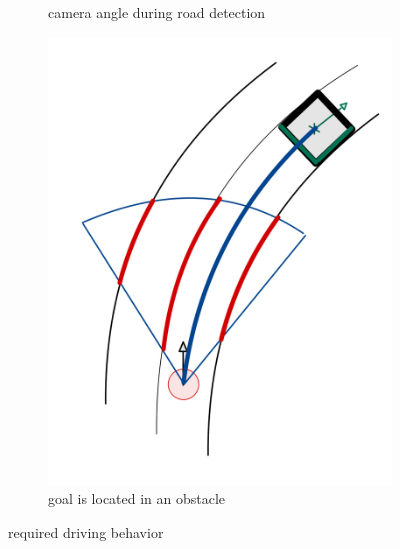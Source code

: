 \begin{figure}
\begin{subfigure}{.3\linewidth}
		\caption{camera angle during road detection}
	\end{subfigure}
	\begin{subfigure}{.3\linewidth}
		\includegraphics[width=\textwidth]{Pictures/finding goal in obstacle}
		\caption{goal is located in an obstacle}
	\end{subfigure}

	\caption{required driving behavior}
	\label{nav edge case}
\end{figure}










